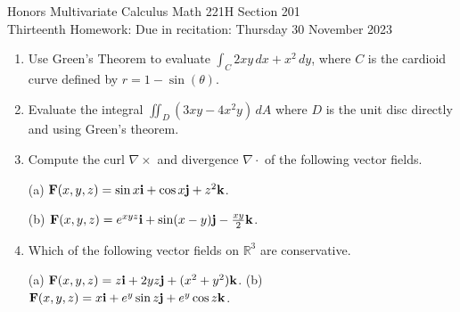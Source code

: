 \documentclass[12pt]{article}
\newcommand{\RR}{{\mathbb R}}  %
\newcommand{\bfF}{{\bf F}}    %
\newcommand{\bfi}{{\bf i}}    %
\newcommand{\bfj}{{\bf j}}    %
\newcommand{\bfk}{{\bf k}}    %
\begin{document}
\LARGE 
\noindent
{\color{Maroon}Honors Multivariate Calculus \hfill Math 221H Section 201}\vspace{2pt}\\
\large
Thirteenth Homework:\hfill 
Due in recitation: Thursday 30 November 2023\vspace{2pt}

\normalsize
    \vspace{2pt}

\begin{enumerate}


\item  
  Use Green's Theorem to evaluate $\int_C 2xy\, dx + x^2\, dy$, where $C$ is the cardioid curve defined by\newline
  $r=1-\sin(\theta)$.\vspace{-2pt}
   
\item
  Evaluate the integral ${\displaystyle \iint_D (3xy -4x^2y)\, dA}$ where $D$ is the unit disc directly and using Green's theorem.
  \vspace{-2pt}

\item Compute the curl $\nabla\times$ and divergence $\nabla \cdot$ of the following vector fields.

  (a) $\bfF(x,y,z) = \sin x \bfi + \cos x \bfj + z^2 \bfk$.


  (b) $\bfF(x,y,z) = e^{xyz}\bfi + \sin(x-y)\bfj - \tfrac{xy}{2}\bfk$.
\vspace{-2pt}
   
\item Which of the following vector fields on $\RR^3$ are conservative.

  (a) $\bfF(x,y,z)=z\bfi + 2yz\bfj + (x^2+y^2)\bfk$.
  \qquad
  (b) $\bfF(x,y,z)= x\bfi + e^y\sin z \bfj + e^y \cos z\bfk$.
\vspace{-2pt}
   

\end{enumerate}
\end{document}
